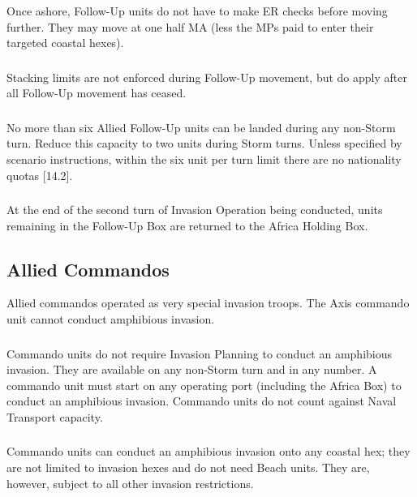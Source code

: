 \subsubsection{} Once ashore, Follow-Up units do not have to make ER checks before moving further. They may move at one half MA (less the MPs paid to enter their targeted coastal hexes).

\subsubsection{} Stacking limits are not enforced during Follow-Up movement, but do apply after all Follow-Up movement has ceased.

\subsubsection{} No more than six Allied Follow-Up units can be landed during any non-Storm turn. Reduce this capacity to two units during Storm turns. Unless specified by scenario instructions, within the six unit per turn limit there are no nationality quotas [14.2].

\subsubsection{} At the end of the second turn of Invasion Operation being conducted, units remaining in the Follow-Up Box are returned to the Africa Holding Box.

\subsection{Allied Commandos}

Allied commandos operated as very special invasion troops. The Axis commando unit cannot conduct amphibious invasion.

\subsubsection{} Commando units do not require Invasion Planning to conduct an amphibious invasion. They are available on any non-Storm turn and in any number. A commando unit must start on any operating port (including the Africa Box) to conduct an amphibious invasion. Commando units do not count against Naval Transport capacity.

\subsubsection{} Commando units can conduct an amphibious invasion onto any coastal hex; they are not limited to invasion hexes and do not need Beach units. They are, however, subject to all other invasion restrictions.

